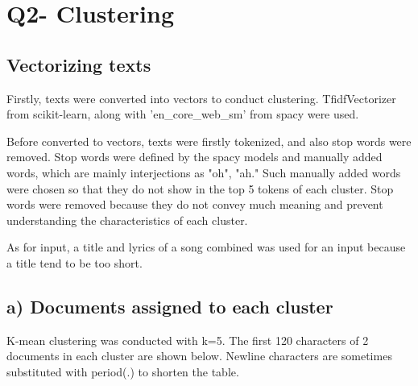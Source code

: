 \documentclass[a4paper,11pt]{article}
\begin{document}

\section{Q2- Clustering}
\subsection{Vectorizing texts}
Firstly, texts were converted into vectors to conduct clustering.
TfidfVectorizer from scikit-learn, along with 'en\_core\_web\_sm' from spacy were used.

Before converted to vectors, texts were firstly tokenized, and also stop words were removed.
Stop words were defined by the spacy models and manually added words, which are mainly interjections as "oh", "ah."
Such manually added words were chosen so that they do not show in the top 5 tokens of each cluster.
Stop words were removed because they do not convey much meaning and prevent understanding the characteristics of each cluster.

As for input, a title and lyrics of a song combined was used for an input because a title tend to be too short.


\subsection{a) Documents assigned to each cluster}
K-mean clustering was conducted with k=5.
The first 120 characters of 2 documents in each cluster are shown below.
Newline characters are sometimes substituted with period(.) to shorten the table.
\end{document}
